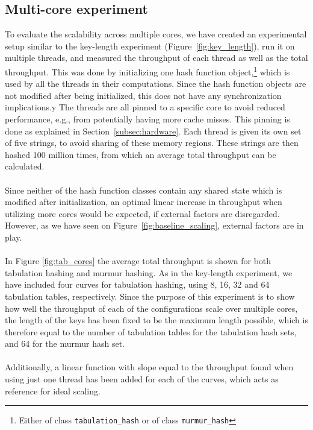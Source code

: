 \documentclass[11pt]{report} %
\begin{document}
\subsection{Multi-core experiment}
\label{subsec:hash_func_multi_core}
To evaluate the scalability across multiple cores, we have created an experimental setup similar to the key-length experiment (Figure~\ref{fig:key_length}), run it on multiple threads, and measured the throughput of each thread as well as the total throughput. This was done by initializing one hash function object,\footnote{Either of class \verb|tabulation_hash| or of class \verb|murmur_hash|} which is used by all the threads in their computations. Since the hash function objects are not modified after being initialized, this does not have any synchronization implications.y The threads are all pinned to a specific core to avoid reduced performance, e.g., from potentially having more cache misses. This pinning is done as explained in Section~\ref{subsec:hardware}. Each thread is given its own set of five strings, to avoid sharing of these memory regions. These strings are then hashed 100 million times, from which an average total throughput can be calculated. \\
\\
Since neither of the hash function classes contain any shared state which is modified after initialization, an optimal linear increase in throughput when utilizing more cores would be expected, if external factors are disregarded. However, as we have seen on Figure~\ref{fig:baseline_scaling}, external factors are in play. \\
\\
In Figure \ref{fig:tab_cores} the average total throughput is shown for both tabulation hashing and murmur hashing. As in the key-length experiment, we have included four curves for tabulation hashing, using 8, 16, 32 and 64 tabulation tables, respectively. Since the purpose of this experiment is to show how well the throughput of each of the configurations scale over multiple cores, the length of the keys has been fixed to be the maximum length possible, which is therefore equal to the number of tabulation tables for the tabulation hash sets, and 64 for the murmur hash set. \\
\\
Additionally, a linear function with slope equal to the throughput found when using just one thread has been added for each of the curves, which acts as reference for ideal scaling.\\
\end{document}
